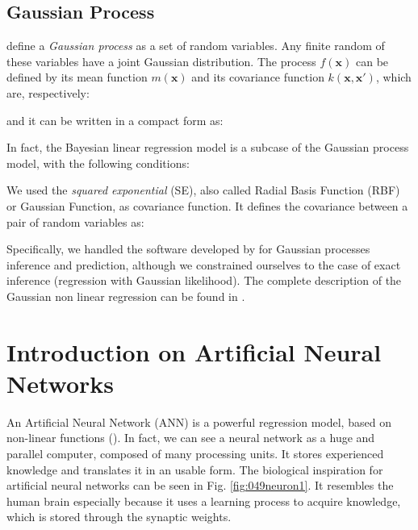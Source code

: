 \subsection{Gaussian Process}
\label{subsec:gaussianprocess}

\citet{RefWorks:192} define a \textit{Gaussian process} as a set of random variables. 
Any finite random of these variables have a joint Gaussian distribution.
The process $f(\mathbf{x})$ can be defined by its mean function $m(\mathbf{x})$
and its covariance function $k(\mathbf{x, x'})$, which are, respectively:


and it can be written in a compact form as:

In fact, the Bayesian linear regression model is a subcase of the Gaussian
process model, with the following conditions:

We used the \textit{squared exponential} (SE), also called Radial Basis Function
(RBF) or Gaussian Function, as covariance function. It defines the covariance
between a pair of random variables as:


Specifically, we handled the software developed by \citet{RefWorks:192} 
for Gaussian processes inference and prediction, although we constrained ourselves to the case of exact inference
(regression with Gaussian likelihood).
The complete description of the Gaussian non linear regression can be found in
\citet{RefWorks:194}.


\section{Introduction on Artificial Neural Networks}
\label{sec:annintro}
An Artificial Neural Network (\acs{ANN}) is a powerful regression model, 
based on non-linear functions (\citet{RefWorks:158}). 
In fact, we can see a neural network as a huge and parallel computer, composed
of many processing units. 
It stores experienced knowledge and translates it in
an usable form. 
The biological inspiration for artificial neural networks can be seen in Fig.
\ref{fig:049neuron1}. 
It resembles the human brain especially because it
uses a learning process to acquire knowledge, which is stored through the
synaptic weights.



